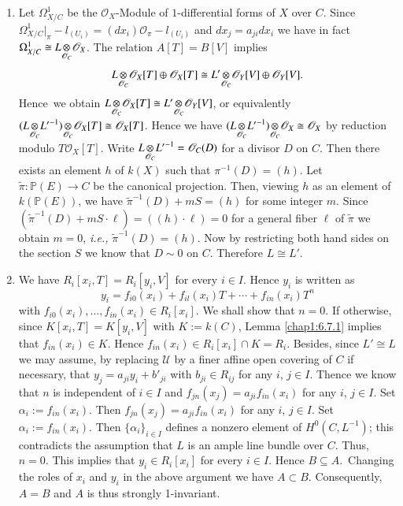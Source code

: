 \begin{proofofprop*}
\begin{enumerate}
\item Let $\Omega^{1}_{X/C}$ be the $\mathscr{O}_{X}$-Module of
  $1$-differential forms of $X$ over $C$. Since
  $\Omega^{1}_{X/C}|_{\pi}-l_{(U_{i})}=(dx_{i})\mathscr{O}_{\pi}-l_{(U_{i})}$
  and $dx_{j}=a_{ji}dx_{i}$ we have in fact $\Omega^{1}_{X/C}\cong
  \foprod{L}{\mathscr{O}_{X}}{\mathscr{O}_{C}}$. The relation
  $A[T]=B[V]$ implies 
$$
\foprod{L}{\mathscr{O}_{X}}{\mathscr{O}_{C}}[T]\oplus
\mathscr{O}_{X}[T]\cong
\foprod{L'}{\mathscr{O}_{Y}}{\mathscr{O}_{C}}[V]\oplus \mathscr{O}_{Y}[V].
$$
Hence\pageoriginale\ we obtain
$\foprod{L}{\mathscr{O}_{X}[T]}{\mathscr{O}_{C}}\cong
\foprod{L'}{\mathscr{O}_{Y}[V]}{\mathscr{O}_{C}}$, or equivalently
 \break$\foprod{(\foprod{L}{{L'}^{-1}}{\mathscr{O}_{C}})}{\mathscr{O}_{X}[T]\cong
\mathscr{O}_{X}[T]}{\mathscr{O}_{C}}$. Hence we have
  $\foprod{(\foprod{L}{{L'}^{-1}}{\mathscr{O}_{C}})}{\mathscr{O}_{X}\cong 
\mathscr{O}_{X}}{\mathscr{O}_{C}}$ by reduction modulo
$T\mathscr{O}_{X}[T]$. Write
$\foprod{L}{{L'}^{-1}}{\mathscr{O}_{C}}=\mathscr{O}_{C}(D)$ for a
divisor $D$ on $C$. Then there exists an element $h$ of $k(X)$ such
that $\pi^{-1}(D)=(h)$. Let $\widetilde{\pi}:\mathbb{P}(E)\to C$ be
the canonical projection. Then, viewing $h$ as an element of
$k(\mathbb{P}(E))$, we have $\widetilde{\pi}^{-1}(D)+mS=(h)$ for some
integer $m$. Since
$(\widetilde{\pi}^{-1}(D)+mS\cdot\ell)=((h)\cdot\ell)=0$ for a general
fiber $\ell$ of $\widetilde{\pi}$ we obtain $m=0$, {\em i.e.,}
$\widetilde{\pi}^{-1}(D)=(h)$. Now by restricting both hand sides on
the section $S$ we know that $D\sim 0$ on $C$. Therefore $L\cong L'$.

\item We have $R_{i}[x_{i},T]=R_{i}[y_{i},V]$ for every $i\in
  I$. Hence $y_{i}$ is written as
$$
y_{i}=f_{i0}(x_{i})+f_{il}(x_{i})T+\cdots+f_{in}(x_{i})T^{n}
$$
with $f_{i0}(x_{i}),\ldots,f_{in}(x_{i})\in R_{i}[x_{i}]$. We shall
show that $n=0$. If otherwise, since $K[x_{i},T]=K[y_{i},V]$ with
$K:=k(C)$, Lemma \ref{chap1:6.7.1} implies that $f_{in}(x_{i})\in
K$. Hence $f_{in}(x_{i})\in R_{i}[x_{i}]\cap K=R_{i}$. Besides, since
$L'\cong L$ we may assume, by replacing $\mathscr{U}$ by a finer
affine open covering of $C$ if necessary, that
$y_{j}=a_{ji}y_{i}+b'_{ji}$ with $b_{ji}\in R_{ij}$ for any $i$, $j\in
I$. Thence we know that $n$ is independent of $i\in I$ and
$f_{jn}(x_{j})=a_{ji}f_{in}(x_{i})$ for any $i$, $j\in I$. Set
$\alpha_{i}:=f_{in}(x_{i})$. Then $f_{jn}(x_{j})=a_{ji}f_{in}(x_{i})$
for any $i$, $j\in I$. Set $\alpha_{i}:=f_{in}(x_{i})$. Then
$\{\alpha_{i}\}_{i\in I}$ defines a nonzero element of
$H^{0}(C,L^{-1})$; this contradicts the assumption that $L$ is an
ample line bundle over $C$. Thus, $n=0$. This implies that $y_{i}\in
R_{i}[x_{i}]$ for every $i\in I$. Hence $B\subseteq
A$.\pageoriginale\ 
Changing the roles of $x_{i}$ and $y_{i}$ in the above argument we
have $A\subset B$. Consequently, $A=B$ and $A$ is thus strongly
1-invariant.
\end{enumerate}
\end{proofofprop*}

